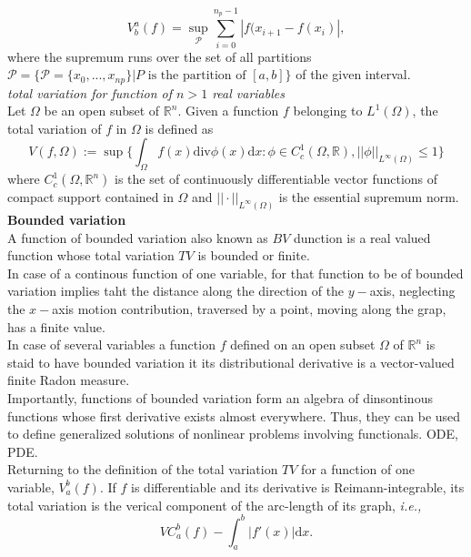 \documentclass[11pt,a4paper,headinclude=true,DIV=14,BCOR=8mm,chapterprefix,listof=totoc,twoside,openright,abstracton]{scrbook}
\begin{document}
\begin{sidenote}
\begin{equation}
        V_b ^a (f) = \sup_{\mathcal{P}}\sum_{i=0}^{n_p -1}|f(x_{i+1} - f(x_i)|,
    \end{equation}
    where the supremum runs over the set of all partitions $\mathcal{P} = \{\mathcal{P}=\{x_0,...,x_{np}\}|P\text{ is the partition of }[a,b]\}$ of the given interval. \\
    \textit{total variation for function of $n>1$ real variables} \\
    Let $\Omega$ be an open subset of $\mathbb{R}^n$. Given a function $f$ belonging to $L^1(\Omega)$, the total variation of $f$ in $\Omega$ is defined as 
    \begin{equation}
        V(f,\Omega):=\sup\Bigg\{\int_{\Omega}f(x)\text{div}\phi(x)\text{d}x:\phi\in C_{c}^1(\Omega, \mathbb{R}), ||\phi||_{L^{\infty}(\Omega)}\leq 1\Bigg\}
    \end{equation}
    where $C_c ^1(\Omega, \mathbb{R}^n)$ is the set of continuously differentiable vector functions of compact support contained in $\Omega$ and $||\cdot||_{L^{\infty}(\Omega)}$ is the essential supremum norm. 
    \textbf{Bounded variation} \\
    A function of bounded variation also known as $BV$ dunction is a real valued function whose total variation $TV$ is bounded or finite. \\
    In case of a continous function of one variable, for that function to be of  bounded variation implies taht the distance along the direction of the $y-$axis, neglecting the $x-$axis motion contribution, traversed by a point, moving along the grap, has a finite value. \\
    In case of several variables a function $f$ defined on an open subset $\Omega$ of $\mathbb{R}^n$ is staid to have bounded variation it its distributional derivative is a vector-valued finite Radon measure.\\
    Importantly, functions of bounded variation form an algebra of dinsontinous functions whose first derivative exists almost everywhere. Thus, they can be used to define generalized solutions of nonlinear problems involving functionals. ODE, PDE.\\
    Returning to the definition of the total variation $TV$ for a function of one variable, $V_a ^b (f)$. If $f$ is differentiable and its derivative is Reimann-integrable, its total variation is the verical component of the arc-length of its graph, \textit{i.e.,}
    \begin{equation}
        VC_a ^b(f) - \int_a ^b |f'(x)|\text{d}x.
    \end{equation}

\end{sidenote}
\end{document}
